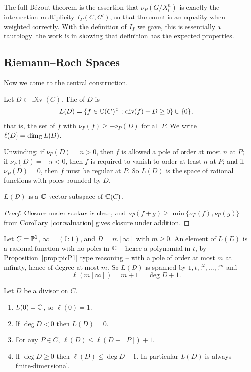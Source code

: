 \documentclass[a4paper]{scrartcl}
\DeclareMathOperator{\Div}{Div}
\DeclareMathOperator{\Divv}{div}
\begin{document}
The full B\'ezout theorem is the assertion that $\nu_P(G/X_i^n)$ is exactly the intersection multiplicity $I_P(C,C')$, so that the count is an equality when weighted correctly. With the definition of $I_P$ we gave, this is essentially a tautology; the work is in showing that definition has the expected properties.

\subsection{Riemann--Roch Spaces}

Now we come to the central construction.

\begin{definition}
	Let $D \in \Div(C)$. The  of $D$ is
	$$L(D) = \{f \in \C(C)^\times : \Divv(f) + D \geq 0\}\cup\{0\},$$
	that is, the set of $f$ with $\nu_P(f) \geq -\nu_P(D)$ for all $P$. We write $\ell(D) = \dim_{\mathbb{C}} L(D)$.
\end{definition}

Unwinding: if $\nu_P(D) = n > 0$, then $f$ is allowed a pole of order at most $n$ at $P$; if $\nu_P(D) = -n < 0$, then $f$ is required to vanish to order at least $n$ at $P$; and if $\nu_P(D) = 0$, then $f$ must be regular at $P$. So $L(D)$ is the space of rational functions with poles bounded by $D$.

\begin{proposition}
	$L(D)$ is a $\mathbb{C}$-vector subspace of $\mathbb{C}(C)$.
\end{proposition}

\begin{proof}
	Closure under scalars is clear, and $\nu_P(f+g)\geq\min\{\nu_P(f),\nu_P(g)\}$ from Corollary~\ref{cor:valuation} gives closure under addition.
\end{proof}

\begin{example}\label{ex:LDP1}
	Let $C = \mathbb{P}^1$, $\infty = (0:1)$, and $D = m[\infty]$ with $m \geq 0$. An element of $L(D)$ is a rational function with no poles in $\mathbb{C}$ -- hence a polynomial in $t$, by Proposition~\ref{prop:picP1} type reasoning -- with a pole of order at most $m$ at infinity, hence of degree at most $m$. So $L(D)$ is spanned by $1,t,t^2,\dots,t^m$ and
	$$\ell(m[\infty]) = m+1 = \deg D + 1.$$
\end{example}

\begin{proposition}\label{prop:ellbounds}
	Let $D$ be a divisor on $C$.
	\begin{enumerate}[label=(\roman*)]
		\item $L(0) = \mathbb{C}$, so $\ell(0) = 1$.
		\item If $\deg D < 0$ then $L(D) = 0$.
		\item For any $P \in C$, $\ell(D) \leq \ell(D - [P]) + 1$.
		\item If $\deg D \geq 0$ then $\ell(D)\leq \deg D + 1$. In particular $L(D)$ is always finite-dimensional.
	\end{enumerate}
\end{proposition}
\end{document}
